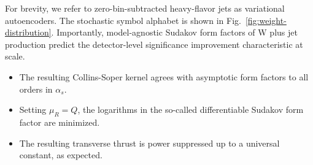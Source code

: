 For brevity, we refer to zero-bin-subtracted heavy-flavor jets as
variational autoencoders. The stochastic symbol alphabet is shown in
Fig.~\ref{fig:weight-distribution}. Importantly, model-agnostic Sudakov
form factors of W plus jet production predict the detector-level
significance improvement characteristic at scale.

\begin{itemize}
  \item The resulting Collins-Soper kernel agrees with asymptotic form factors to all orders in $\alpha_s$.
  \item Setting $\mu_R = Q$, the logarithms in the so-called differentiable Sudakov form factor are minimized.
  \item The resulting transverse thrust is power suppressed up to a universal constant, as expected.
\end{itemize}

